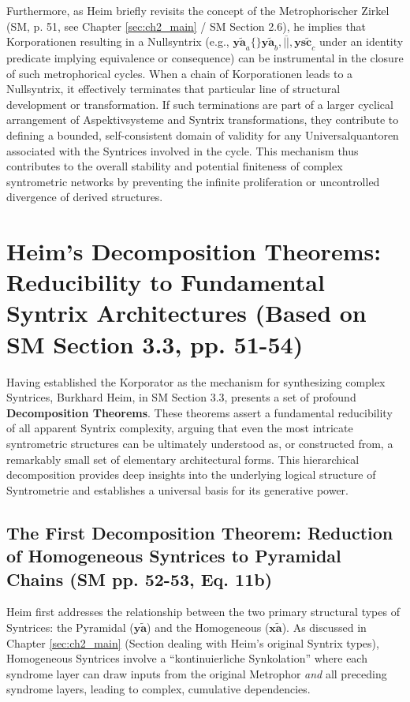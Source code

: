 \documentclass[
    12pt,              %
    a4paper,           %
    headings=normal,   %
    twoside=true,      %
    BCOR=8mm,          %
]{scrbook}
\newcommand{\q}[1]{\enquote{#1}}
\newcommand{\syntrix}{\bm{y\widetilde{a}}}
\newcommand{\homogeneoussyntrix}{\bm{x\widetilde{a}}}
\newcommand{\nullsyntrix}{\bm{ys\widetilde{c}}}
\begin{document}
Furthermore, as Heim briefly revisits the concept of the Metrophorischer Zirkel (SM, p. 51, see Chapter \ref{sec:ch2_main} / SM Section 2.6), he implies that Korporationen resulting in a Nullsyntrix (e.g., \( \syntrix_a \{ \} \syntrix_b, \overline{||}, \nullsyntrix_c \) under an identity predicate implying equivalence or consequence) can be instrumental in the closure of such metrophorical cycles. When a chain of Korporationen leads to a Nullsyntrix, it effectively terminates that particular line of structural development or transformation. If such terminations are part of a larger cyclical arrangement of Aspektivsysteme and Syntrix transformations, they contribute to defining a bounded, self-consistent domain of validity for any Universalquantoren associated with the Syntrices involved in the cycle. This mechanism thus contributes to the overall stability and potential finiteness of complex syntrometric networks by preventing the infinite proliferation or uncontrolled divergence of derived structures.

\section{Heim's Decomposition Theorems: Reducibility to Fundamental Syntrix Architectures (Based on SM Section 3.3, pp. 51-54)}
\label{sec:ch3_decomposition_theorem_main} %

Having established the Korporator as the mechanism for synthesizing complex Syntrices, Burkhard Heim, in SM Section 3.3, presents a set of profound \textbf{Decomposition Theorems}. These theorems assert a fundamental reducibility of all apparent Syntrix complexity, arguing that even the most intricate syntrometric structures can be ultimately understood as, or constructed from, a remarkably small set of elementary architectural forms. This hierarchical decomposition provides deep insights into the underlying logical structure of Syntrometrie and establishes a universal basis for its generative power.

\subsection{The First Decomposition Theorem: Reduction of Homogeneous Syntrices to Pyramidal Chains (SM pp. 52-53, Eq. 11b)}
\label{sec:ch3_first_decomp_theorem} 

Heim first addresses the relationship between the two primary structural types of Syntrices: the Pyramidal (\(\syntrix\)) and the Homogeneous (\(\homogeneoussyntrix\)). As discussed in Chapter \ref{sec:ch2_main} (Section dealing with Heim's original Syntrix types), Homogeneous Syntrices involve a \q{kontinuierliche Synkolation} where each syndrome layer can draw inputs from the original Metrophor \textit{and} all preceding syndrome layers, leading to complex, cumulative dependencies.
\end{document}
